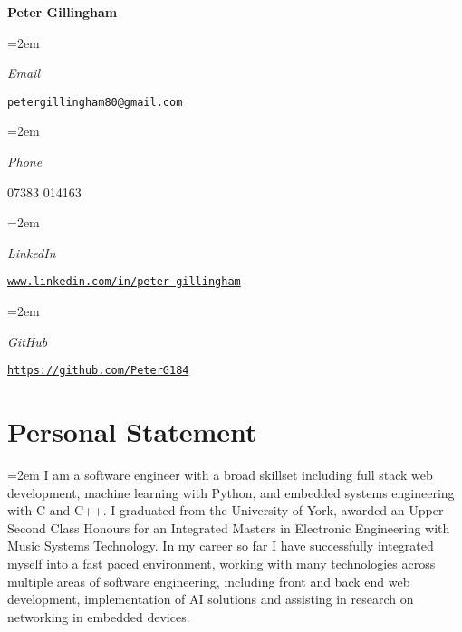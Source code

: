 \documentclass[12pt]{article} %
\newlength{\spacebox}
\newcommand{\sepspace}{\vspace*{1em}}
\newcommand{\name}[1]{
\Huge %
\fontfamily{phv}\selectfont %
\begin{center} \textbf{#1} \end{center}\par
\normalsize\normalfont}
\newcommand{\info}[2]{
    \noindent\hangindent=2em\hangafter=0
    \parbox{\spacebox}{%
    \textsl{#1}} %
    #2 \par} %
\newcommand{\personalstatement}[1]{
  \vspace*{0.5em}
  \noindent\hangindent=2em\hangafter=0 \small #1 
\normalsize \par}
\begin{document}
\name{Peter Gillingham}
\vspace*{-10pt}

\sepspace
\info{Email}{\texttt{petergillingham80@gmail.com}}
\info{Phone}{07383 014163}
\info{LinkedIn}{\texttt{\url{www.linkedin.com/in/peter-gillingham}}}
\info{GitHub}{\texttt{\url{https://github.com/PeterG184}}}

\section*{Personal Statement}
\personalstatement{I am a software engineer with a broad skillset including full stack web development, machine learning with Python, and embedded systems engineering with C and C++. I graduated from the University of York, awarded an Upper Second Class Honours for an Integrated Masters in Electronic Engineering with Music Systems Technology. In my career so far I have successfully integrated myself into a fast paced environment, working with many technologies across multiple areas of software engineering, including front and back end web development, implementation of AI solutions and assisting in research on networking in embedded devices.}

\end{document}
